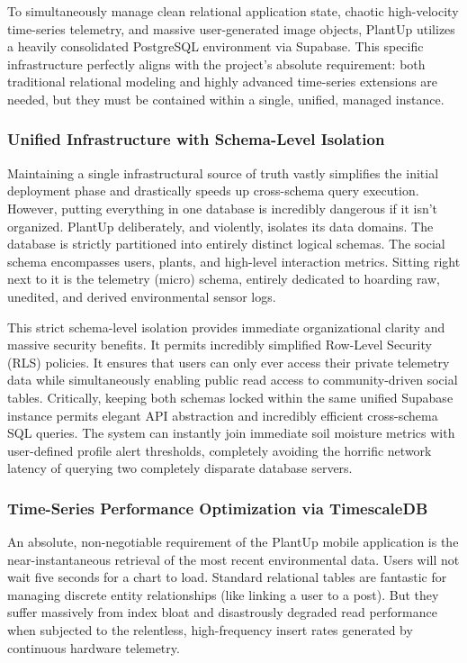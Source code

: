 To simultaneously manage clean relational application state, chaotic high-velocity time-series telemetry, and massive user-generated image objects, PlantUp utilizes a heavily consolidated PostgreSQL environment via Supabase. This specific infrastructure perfectly aligns with the project's absolute requirement: both traditional relational modeling and highly advanced time-series extensions are needed, but they must be contained within a single, unified, managed instance.

\subsubsection{Unified Infrastructure with Schema-Level Isolation}

Maintaining a single infrastructural source of truth vastly simplifies the initial deployment phase and drastically speeds up cross-schema query execution. However, putting everything in one database is incredibly dangerous if it isn't organized. PlantUp deliberately, and violently, isolates its data domains. The database is strictly partitioned into entirely distinct logical schemas. The social schema encompasses users, plants, and high-level interaction metrics. Sitting right next to it is the telemetry (micro) schema, entirely dedicated to hoarding raw, unedited, and derived environmental sensor logs.

This strict schema-level isolation provides immediate organizational clarity and massive security benefits. It permits incredibly simplified Row-Level Security (RLS) policies. It ensures that users can only ever access their private telemetry data while simultaneously enabling public read access to community-driven social tables. Critically, keeping both schemas locked within the same unified Supabase instance permits elegant API abstraction and incredibly efficient cross-schema SQL queries. The system can instantly join immediate soil moisture metrics with user-defined profile alert thresholds, completely avoiding the horrific network latency of querying two completely disparate database servers.

\subsubsection{Time-Series Performance Optimization via TimescaleDB}

An absolute, non-negotiable requirement of the PlantUp mobile application is the near-instantaneous retrieval of the most recent environmental data. Users will not wait five seconds for a chart to load. Standard relational tables are fantastic for managing discrete entity relationships (like linking a user to a post). But they suffer massively from index bloat and disastrously degraded read performance when subjected to the relentless, high-frequency insert rates generated by continuous hardware telemetry.

